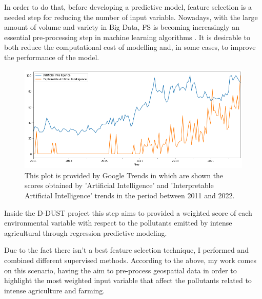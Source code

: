 In order to do that, before developing a predictive model, feature selection is a needed step for reducing the number of input variable. \newline
Nowadays, with the large amount of volume and variety in Big Data, FS is becoming increasingly an essential pre-processing step in machine learning algorithms \cite{kamolov2021feature}.
It is desirable to both reduce the computational cost of modelling and, in some cases, to improve the performance of the model.\newline
\begin{figure}[H]
    \includegraphics[scale=0.50]{images/AI_XAI.png}
    \caption{This plot is provided by Google Trends in which are shown the scores obtained by 'Artificial Intelligence' and 'Interpretable Artificial Intelligence' trends in the period between 2011 and 2022.}
    \label{fig:AI_XAI}
\end{figure}
\bigbreak
Inside the D-DUST project this step aims to provided a weighted score of each environmental variable with respect to the pollutants emitted by intense agricultural through regression predictive modeling.\newline
\par
Due to the fact there isn’t a best feature selection technique, I performed and combined different supervised methods. 
\bigbreak
According to the above, my work comes on this scenario, having the aim to pre-process geospatial data in order to highlight the most weighted input variable that affect the pollutants related to intense agriculture and farming.\newline




